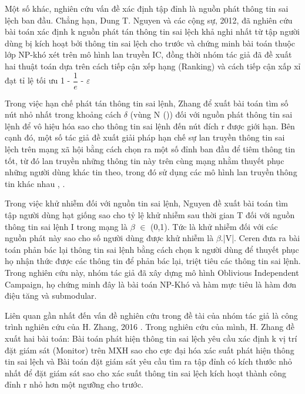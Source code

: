 Một số khác, nghiên cứu vấn đề xác định tập đỉnh là nguồn phát thông tin sai lệch ban đầu. Chẳng hạn, Dung T. Nguyen và các cộng sự, 2012, \cite{nguyen1} đã nghiên cứu bài toán xác định k nguồn phát tán thông tin sai lệch khả nghi nhất từ tập người dùng bị kích hoạt bởi thông tin sai lệch cho trước và chứng minh bài toán thuộc lớp NP-khó xét trên mô hình lan truyền IC, đồng thời nhóm tác giả đã đề xuất hai thuật toán dựa trên cách tiếp cận xếp hạng (Ranking) và cách tiếp cận xấp xỉ đạt tỉ lệ tối ưu 1 - $\dfrac{1}{e}$ - $\varepsilon$

Trong việc hạn chế phát tán thông tin sai lệnh, Zhang \cite{zhang1} để xuất bài toán tìm số nút nhỏ nhất trong khoảng cách $\delta$ (vùng N$_{}$ ()) đối với nguồn phát thông tin sai lệnh để vô hiệu hóa sao cho thông tin sai lệnh đến nút đích r được giới hạn. Bên cạnh đó, một số tác giả đề xuất giải pháp hạn chế sự lan truyền thông tin sai lệch trên mạng xã hội bằng cách chọn ra một số đỉnh ban đầu để tiêm thông tin tốt, từ đó lan truyền những thông tin này trên cùng mạng nhằm thuyết phục những người dùng khác tin theo, trong đó sử dụng các mô hình lan truyền thông tin khác nhau \cite{nguyen9}, \cite{nguyen30}.

Trong việc khử nhiễm đối với nguồn tin sai lệnh, Nguyen \cite{nguyen9} đề xuất bài toán tìm tập người dùng hạt giống sao cho tỷ lệ khử nhiễm sau thời gian T đối với nguồn thông tin sai lệnh I trong mạng là $\beta$ $\in$ (0,1). Tức là khử nhiễm đối với các nguồn phát này sao cho số người dùng được khử nhiễm là $\beta$.|V|. Ceren \cite{ceren} đưa ra bài toán phản bác lại thông tin sai lệnh bằng cách chọn k người dùng để thuyết phục họ nhận thức được các thông tin để phản bác lại, triệt tiêu các thông tin sai lệnh. Trong nghiên cứu này, nhóm tác giả đã xây dựng mô hình Oblivious Independent Campaign, họ chứng minh đây là bài toán NP-Khó và hàm mực tiêu là hàm đơn điệu tăng và submodular.

Liên quan gần nhất đến vấn đề nghiên cứu trong đề tài của nhóm tác giả là công trình nghiên cứu của H. Zhang, 2016 \cite{zhang31}. Trong nghiên cứu của mình, H. Zhang đề xuất hai bài toán: Bài toán phát hiện thông tin sai lệch yêu cầu xác định k vị trí đặt giám sát (Monitor) trên MXH sao cho cực đại hóa xác suất phát hiện thông tin sai lệch và Bài toán đặt giám sát yêu cầu tìm ra tập đỉnh có kích thước nhỏ nhất để đặt giám sát sao cho xác suất thông tin sai lệch kích hoạt thành công đỉnh r nhỏ hơn một ngưỡng cho trước.
